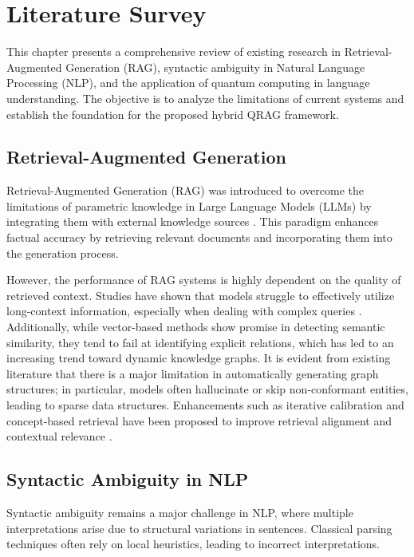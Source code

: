 \chapter{Literature Survey}
This chapter presents a comprehensive review of existing research in Retrieval-Augmented Generation (RAG), syntactic ambiguity in Natural Language Processing (NLP), and the application of quantum computing in language understanding. The objective is to analyze the limitations of current systems and establish the foundation for the proposed hybrid QRAG framework.

\section{Retrieval-Augmented Generation}

Retrieval-Augmented Generation (RAG) was introduced to overcome the limitations of parametric knowledge in Large Language Models (LLMs) by integrating them with external knowledge sources \cite{lewis2021rag}. This paradigm enhances factual accuracy by retrieving relevant documents and incorporating them into the generation process.

However, the performance of RAG systems is highly dependent on the quality of retrieved context. Studies have shown that models struggle to effectively utilize long-context information, especially when dealing with complex queries \cite{liu2023lostmiddle}. Additionally, while vector-based methods show promise in detecting semantic similarity, they tend to fail at identifying explicit relations, which has led to an increasing trend toward dynamic knowledge graphs. It is evident from existing literature that there is a major limitation in automatically generating graph structures; in particular, models often hallucinate or skip non-conformant entities, leading to sparse data structures. Enhancements such as iterative calibration and concept-based retrieval have been proposed to improve retrieval alignment and contextual relevance \cite{sgic2025,concept2025rag}.

\section{Syntactic Ambiguity in NLP}

Syntactic ambiguity remains a major challenge in NLP, where multiple interpretations arise due to structural variations in sentences. Classical parsing techniques often rely on local heuristics, leading to incorrect interpretations.

